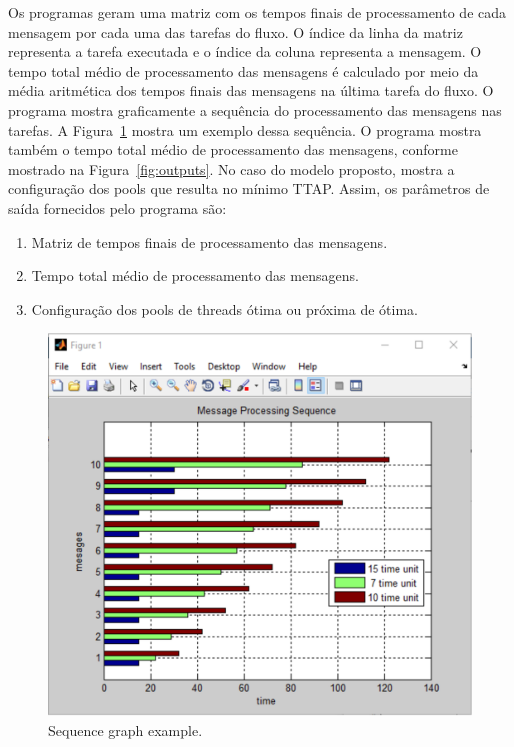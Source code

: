 Os programas geram uma matriz  com os tempos finais de processamento de cada mensagem por cada uma das tarefas do fluxo. O índice da linha da matriz representa a tarefa executada e o índice da coluna representa a mensagem. O tempo total médio de processamento das mensagens é calculado por meio da média aritmética dos tempos finais das mensagens na última tarefa do fluxo. O programa mostra graficamente a sequência do processamento das mensagens nas tarefas. A Figura~\ref{fig:graphic_sequence} mostra um exemplo dessa sequência. O programa mostra também o tempo total médio de processamento das mensagens, conforme mostrado na Figura~\ref{fig:outputs}. No caso do modelo proposto, mostra a configuração dos pools que resulta no mínimo TTAP. Assim, os parâmetros de saída fornecidos pelo programa são:
\begin{enumerate}
                 \item Matriz de tempos finais de processamento das mensagens.
                 \item Tempo total médio de processamento das mensagens.
                 \item Configuração dos pools de threads ótima ou próxima de ótima. 
\end{enumerate}
\begin{figure}[h]
\centering
 \includegraphics[width=1\linewidth]{./figs/graphic_sequence.eps}
 \caption{Sequence graph example.}
\label{fig:graphic_sequence}
\end{figure}
